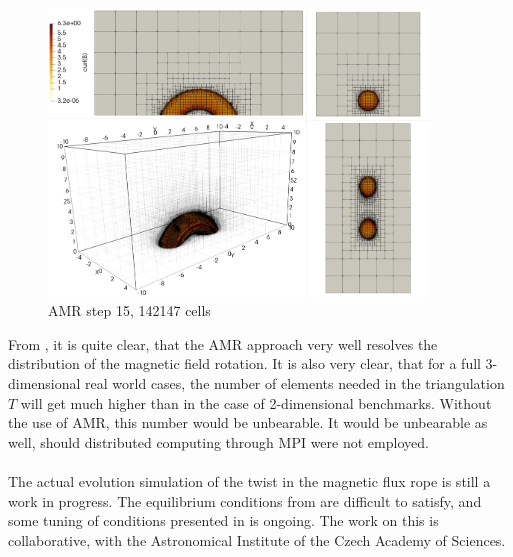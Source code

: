 \begin{figure}[H]
	\centering
	\includegraphics[width=0.9\textwidth]{img/td/td6.jpg}
\vspace{-2mm}
\caption{AMR step 15, 142147 cells}
\label{figure:myTd6}
\end{figure}
\vspace{-2mm}

From , it is quite clear, that the AMR approach very well resolves the distribution of the magnetic field rotation. It is also very clear, that for a full 3-dimensional real world cases, the number of elements needed in the triangulation $T$ will get much higher than in the case of 2-dimensional benchmarks. Without the use of AMR, this number would be unbearable. It would be unbearable as well, should distributed computing through MPI were not employed.
\paragraph{}
The actual evolution simulation of the twist in the magnetic flux rope is still a work in progress. The equilibrium conditions from \cite{td} are difficult to satisfy, and some tuning of conditions presented in \cite{miraClanek} is ongoing. The work on this is collaborative, with the Astronomical Institute of the Czech Academy of Sciences.